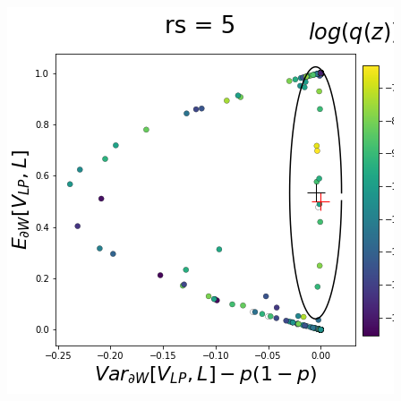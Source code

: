 \documentclass[11pt]{article}
\begin{document}
\begin{center}
\includegraphics[scale=0.33]{figs/T_x_SC_full_c=0_p=50_rs=5.png}
\end{center}
\end{document}
